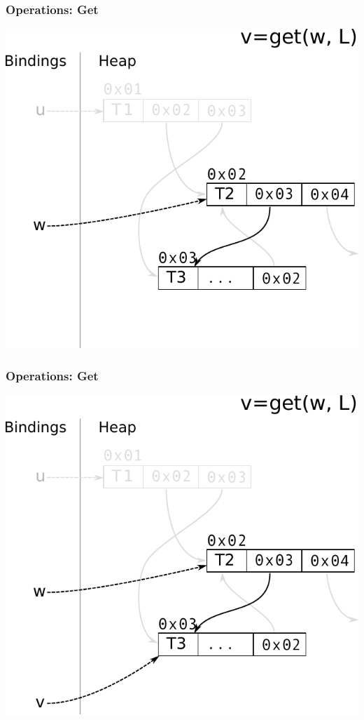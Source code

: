 \documentclass[utf8x]{beamer}
\begin{document}
\begin{frame}[plain]
  \frametitle{Operations: Get}
  \includegraphics[scale=0.8]{figures/get01}
\end{frame}

\begin{frame}[plain]
  \frametitle{Operations: Get}
  \includegraphics[scale=0.8]{figures/get02}
\end{frame}
\end{document}

